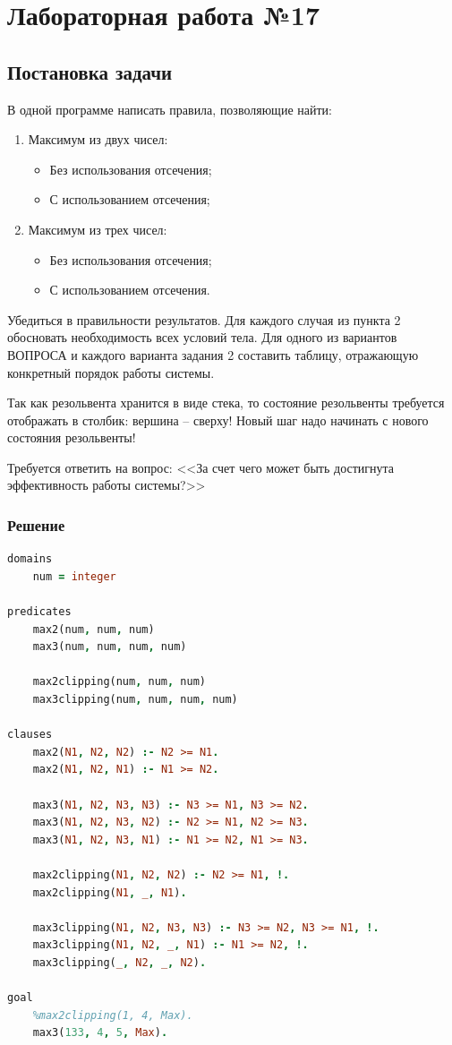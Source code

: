 \documentclass[12pt]{report}
\begin{document}
\chapter*{Лабораторная работа №17}
\section*{Постановка задачи}

В одной программе написать правила, позволяющие найти:

\begin{enumerate}
	\item Максимум из двух чисел:
	\begin{itemize}
		\item Без использования отсечения;
		\item С использованием отсечения;
	\end{itemize}
	\item Максимум из трех чисел:
	\begin{itemize}
		\item Без использования отсечения;
		\item С использованием отсечения.
	\end{itemize}
\end{enumerate}

Убедиться в правильности результатов. Для каждого случая из пункта 2 обосновать необходимость всех условий тела. Для одного из вариантов ВОПРОСА и каждого варианта задания 2 составить таблицу, отражающую конкретный порядок работы системы.

Так как резольвента хранится в виде стека, то состояние резольвенты требуется отображать в столбик: вершина – сверху! Новый шаг надо начинать с нового состояния резольвенты!

Требуется ответить на вопрос: <<За счет чего может быть достигнута эффективность работы системы?>>

\subsection*{Решение}
\begin{lstlisting}[language=prolog]
domains
	num = integer

predicates
	max2(num, num, num)
	max3(num, num, num, num)
	
	max2clipping(num, num, num)
	max3clipping(num, num, num, num)

clauses
	max2(N1, N2, N2) :- N2 >= N1.
	max2(N1, N2, N1) :- N1 >= N2.
	
	max3(N1, N2, N3, N3) :- N3 >= N1, N3 >= N2.
	max3(N1, N2, N3, N2) :- N2 >= N1, N2 >= N3.
	max3(N1, N2, N3, N1) :- N1 >= N2, N1 >= N3.
	
	max2clipping(N1, N2, N2) :- N2 >= N1, !.
	max2clipping(N1, _, N1).
	
	max3clipping(N1, N2, N3, N3) :- N3 >= N2, N3 >= N1, !.
	max3clipping(N1, N2, _, N1) :- N1 >= N2, !.
	max3clipping(_, N2, _, N2).

goal
	%max2clipping(1, 4, Max).
	max3(133, 4, 5, Max).
\end{lstlisting}


	
\end{document}
